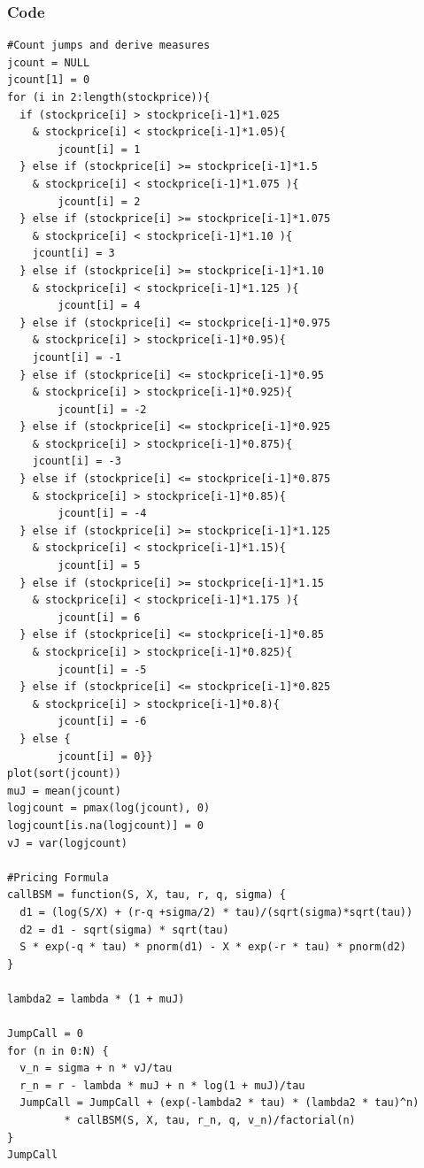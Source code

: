 \documentclass[paper=a4, fontsize=12pt]{scrartcl} %
\numberwithin{equation}{section}
\begin{document}
\newpage
\subsubsection{Code}

\begin{lstlisting}[caption={Pricing European Call with Jumps}]
#Count jumps and derive measures
jcount = NULL
jcount[1] = 0
for (i in 2:length(stockprice)){
  if (stockprice[i] > stockprice[i-1]*1.025 
  	& stockprice[i] < stockprice[i-1]*1.05){
    	jcount[i] = 1
  } else if (stockprice[i] >= stockprice[i-1]*1.5 
  	& stockprice[i] < stockprice[i-1]*1.075 ){
    	jcount[i] = 2
  } else if (stockprice[i] >= stockprice[i-1]*1.075 
  	& stockprice[i] < stockprice[i-1]*1.10 ){
   	jcount[i] = 3
  } else if (stockprice[i] >= stockprice[i-1]*1.10 
  	& stockprice[i] < stockprice[i-1]*1.125 ){
    	jcount[i] = 4
  } else if (stockprice[i] <= stockprice[i-1]*0.975 
  	& stockprice[i] > stockprice[i-1]*0.95){
   	jcount[i] = -1
  } else if (stockprice[i] <= stockprice[i-1]*0.95 
  	& stockprice[i] > stockprice[i-1]*0.925){
    	jcount[i] = -2
  } else if (stockprice[i] <= stockprice[i-1]*0.925 
  	& stockprice[i] > stockprice[i-1]*0.875){
   	jcount[i] = -3
  } else if (stockprice[i] <= stockprice[i-1]*0.875 
  	& stockprice[i] > stockprice[i-1]*0.85){
    	jcount[i] = -4
  } else if (stockprice[i] >= stockprice[i-1]*1.125 
  	& stockprice[i] < stockprice[i-1]*1.15){
    	jcount[i] = 5
  } else if (stockprice[i] >= stockprice[i-1]*1.15 
  	& stockprice[i] < stockprice[i-1]*1.175 ){
    	jcount[i] = 6
  } else if (stockprice[i] <= stockprice[i-1]*0.85 
  	& stockprice[i] > stockprice[i-1]*0.825){
    	jcount[i] = -5
  } else if (stockprice[i] <= stockprice[i-1]*0.825 
  	& stockprice[i] > stockprice[i-1]*0.8){
    	jcount[i] = -6
  } else {
    	jcount[i] = 0}}
plot(sort(jcount))
muJ = mean(jcount)
logjcount = pmax(log(jcount), 0)
logjcount[is.na(logjcount)] = 0
vJ = var(logjcount)

#Pricing Formula
callBSM = function(S, X, tau, r, q, sigma) {
  d1 = (log(S/X) + (r-q +sigma/2) * tau)/(sqrt(sigma)*sqrt(tau))
  d2 = d1 - sqrt(sigma) * sqrt(tau)
  S * exp(-q * tau) * pnorm(d1) - X * exp(-r * tau) * pnorm(d2)
}

lambda2 = lambda * (1 + muJ)

JumpCall = 0
for (n in 0:N) {
  v_n = sigma + n * vJ/tau
  r_n = r - lambda * muJ + n * log(1 + muJ)/tau
  JumpCall = JumpCall + (exp(-lambda2 * tau) * (lambda2 * tau)^n)
  		 * callBSM(S, X, tau, r_n, q, v_n)/factorial(n)
}
JumpCall

\end{lstlisting}
\end{document}
